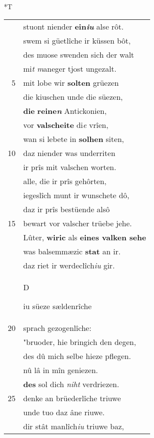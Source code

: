 \documentclass[8pt,a4paper,notitlepage]{article}
\begin{document}
\begin{table}[ht]
\begin{minipage}[t]{0.5\linewidth}
\end{minipage}
\hspace{0.5cm}
\begin{minipage}[t]{0.5\linewidth}
\small
\begin{center}*T
\end{center}
\begin{tabular}{rl}
 & stuont niender \textbf{ein\textit{iu}} alse rôt.\\ 
 & swem si güetlîche ir küssen bôt,\\ 
 & des muose swenden sich der walt\\ 
 & mi\textit{t} \textit{m}aneger tjost ungezalt.\\ 
5 & mit lobe wir \textbf{solten} grüezen\\ 
 & die kiuschen unde die süezen,\\ 
 & \textbf{die} \textbf{reine\textit{n}} Antickonien,\\ 
 & vor \textbf{valscheite} di\textit{e} vrîen,\\ 
 & wan si lebete in \textbf{solhen} siten,\\ 
10 & daz niender was underriten\\ 
 & ir prîs mit valschen worten.\\ 
 & alle, die ir prîs gehôrten,\\ 
 & iegeslîch munt ir wunschete dô,\\ 
 & daz ir prîs bestüende alsô\\ 
15 & bewart vor valscher trüebe jehe.\\ 
 & Lûter, \textbf{wiric} als \textbf{eines valken sehe}\\ 
 & was balsemmæzic \textbf{stat} an ir.\\ 
 & daz riet ir werdeclîch\textit{iu} gir.\\ 
 & \begin{large}D\end{large}iu süeze sældenrîche\\ 
20 & sprach gezogenlîche:\\ 
 & "bruoder, hie bringich den degen,\\ 
 & des dû mich selbe hieze pflegen.\\ 
 & nû lâ in mîn geniezen.\\ 
 & \textbf{des} sol dich \textit{niht} verdriezen.\\ 
25 & denke an brüederlîche triuwe\\ 
 & unde tuo daz âne riuwe.\\ 
 & dir stât manlîch\textit{iu} triuwe baz,\\ 

\end{tabular}
\end{minipage}
\end{table}
\end{document}

